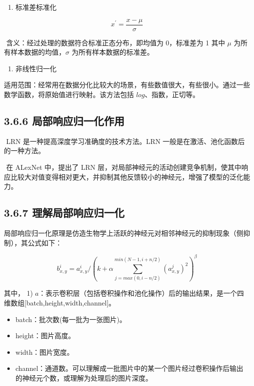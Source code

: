 \begin{enumerate}
\def\labelenumi{\arabic{enumi}.}
\setcounter{enumi}{1}
 
\item
  标准差标准化
\end{enumerate}

\[
x^{\prime} = \frac{x-\mu}{\sigma}
\]

​ 含义：经过处理的数据符合标准正态分布，即均值为 0，标准差为 1 其中 $
\mu $ 为所有样本数据的均值，$ \sigma $ 为所有样本数据的标准差。

\begin{enumerate}
\def\labelenumi{\arabic{enumi}.}
\setcounter{enumi}{2}
 
\item
  非线性归一化
\end{enumerate}

适用范围：经常用在数据分化比较大的场景，有些数值很大，有些很小。通过一些数学函数，将原始值进行映射。该方法包括
$ log $、指数，正切等。

\subsection{3.6.6
局部响应归一化作用}\label{ux5c40ux90e8ux54cdux5e94ux5f52ux4e00ux5316ux4f5cux7528}

​ LRN 是一种提高深度学习准确度的技术方法。LRN
一般是在激活、池化函数后的一种方法。

​ 在 ALexNet 中，提出了 LRN
层，对局部神经元的活动创建竞争机制，使其中响应比较大对值变得相对更大，并抑制其他反馈较小的神经元，增强了模型的泛化能力。

\subsection{3.6.7
理解局部响应归一化}\label{ux7406ux89e3ux5c40ux90e8ux54cdux5e94ux5f52ux4e00ux5316}

​
局部响应归一化原理是仿造生物学上活跃的神经元对相邻神经元的抑制现象（侧抑制），其公式如下：

\[
b_{x,y}^i = a_{x,y}^i / (k + \alpha \sum_{j=max(0, i-n/2)}^{min(N-1, i+n/2)}(a_{x,y}^j)^2 )^\beta
\]

其中， 1) $ a
$：表示卷积层（包括卷积操作和池化操作）后的输出结果，是一个四维数组{[}batch,height,width,channel{]}。

\begin{itemize}
 
\item
  batch：批次数(每一批为一张图片)。
\item
  height：图片高度。
\item
  width：图片宽度。
\item
  channel：通道数。可以理解成一批图片中的某一个图片经过卷积操作后输出的神经元个数，或理解为处理后的图片深度。
\end{itemize}

